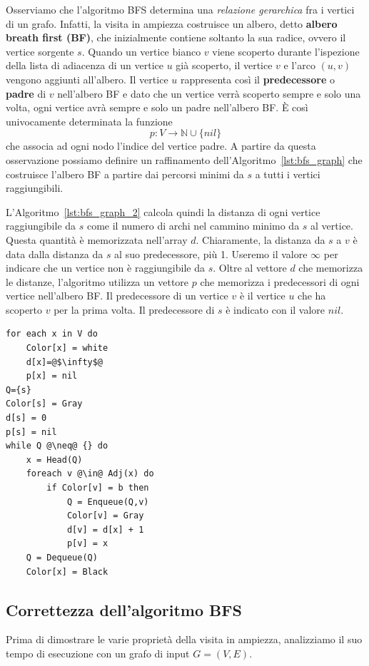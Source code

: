 
Osserviamo che l'algoritmo \textsc{BFS} determina una \textit{relazione gerarchica} fra i vertici di un grafo. Infatti, la visita in ampiezza costruisce un albero, detto \textbf{albero breath first (BF)}, che inizialmente contiene soltanto la sua radice, ovvero il vertice sorgente $s$. Quando un vertice bianco $v$ viene scoperto durante l'ispezione della lista di adiacenza di un vertice $u$ già scoperto, il vertice $v$ e l'arco $(u,v)$ vengono aggiunti all'albero. Il vertice $u$ rappresenta così il \textbf{predecessore} o \textbf{padre} di $v$ nell'albero \textsc{BF} e dato che un vertice verrà scoperto sempre e solo una volta, ogni vertice avrà sempre e solo un padre nell'albero \textsc{BF}. È così univocamente determinata la funzione $$p:V \rightarrow \mathbb{N}\cup \{nil\}$$ che associa ad ogni nodo l'indice del vertice padre. A partire da questa osservazione possiamo definire un raffinamento dell'Algoritmo~\ref{lst:bfs_graph} che costruisce l'albero \textsc{BF} a partire dai percorsi minimi da $s$ a tutti i vertici raggiungibili.

L'Algoritmo~\ref{lst:bfs_graph_2} calcola quindi la distanza di ogni vertice raggiungibile da $s$ come il numero di archi nel cammino minimo da $s$ al vertice. Questa quantità è memorizzata nell'array $d$. Chiaramente, la distanza da $s$ a $v$ è data dalla distanza da $s$ al suo predecessore, più 1. Useremo il valore $\infty$ per indicare che un vertice non è raggiungibile da $s$. Oltre al vettore $d$ che memorizza le distanze, l'algoritmo utilizza un vettore $p$ che memorizza i predecessori di ogni vertice nell'albero \textsc{BF}. Il predecessore di un vertice $v$ è il vertice $u$ che ha scoperto $v$ per la prima volta. Il predecessore di $s$ è indicato con il valore $nil$.

\begin{lstlisting}[language=asd,caption={BFS(G,s)},label=lst:bfs_graph_2]
for each x in V do
	Color[x] = white
	d[x]=@$\infty$@
	p[x] = nil
Q={s}
Color[s] = Gray
d[s] = 0
p[s] = nil
while Q @\neq@ {} do
	x = Head(Q)
	foreach v @\in@ Adj(x) do
		if Color[v] = b then
			Q = Enqueue(Q,v)
			Color[v] = Gray
			d[v] = d[x] + 1
			p[v] = x
	Q = Dequeue(Q)
	Color[x] = Black
\end{lstlisting}

\subsection{Correttezza dell'algoritmo BFS}
Prima di dimostrare le varie proprietà della visita in ampiezza, analizziamo il suo tempo di esecuzione con un grafo di input $G=(V,E)$.

